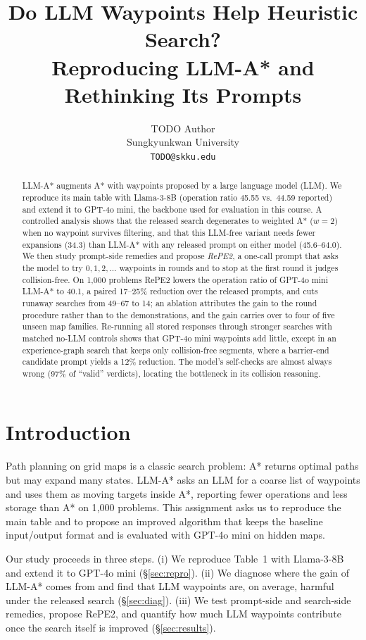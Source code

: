 \documentclass[11pt]{article}
\title{Do LLM Waypoints Help Heuristic Search?\\Reproducing LLM-A* and Rethinking Its Prompts}
\author{TODO Author \\
  Sungkyunkwan University \\
  \texttt{TODO@skku.edu}}
\begin{document}
\maketitle

\begin{abstract}
LLM-A* augments A* with waypoints proposed by a large language model (LLM).
We reproduce its main table with Llama-3-8B (operation ratio 45.55 vs.\ 44.59 reported) and extend it to GPT-4o mini, the backbone used for evaluation in this course.
A controlled analysis shows that the released search degenerates to weighted A* ($w{=}2$) when no waypoint survives filtering, and that this LLM-free variant needs fewer expansions (34.3) than LLM-A* with any released prompt on either model (45.6--64.0).
We then study prompt-side remedies and propose \emph{RePE2}, a one-call prompt that asks the model to try $0,1,2,\dots$ waypoints in rounds and to stop at the first round it judges collision-free.
On 1{,}000 problems RePE2 lowers the operation ratio of GPT-4o mini LLM-A* to 40.1, a paired 17--25\% reduction over the released prompts, and cuts runaway searches from 49--67 to 14; an ablation attributes the gain to the round procedure rather than to the demonstrations, and the gain carries over to four of five unseen map families.
Re-running all stored responses through stronger searches with matched no-LLM controls shows that GPT-4o mini waypoints add little, except in an experience-graph search that keeps only collision-free segments, where a barrier-end candidate prompt yields a 12\% reduction.
The model's self-checks are almost always wrong (97\% of ``valid'' verdicts), locating the bottleneck in its collision reasoning.
\end{abstract}

\section{Introduction}
Path planning on grid maps is a classic search problem: A* \citep{hart1968astar} returns optimal paths but may expand many states.
LLM-A* \citep{meng2024llmastar} asks an LLM for a coarse list of waypoints and uses them as moving targets inside A*, reporting fewer operations and less storage than A* on 1{,}000 problems.
This assignment asks us to reproduce the main table and to propose an improved algorithm that keeps the baseline input/output format and is evaluated with GPT-4o mini on hidden maps.

Our study proceeds in three steps.
(i) We reproduce Table~1 with Llama-3-8B and extend it to GPT-4o mini (\S\ref{sec:repro}).
(ii) We diagnose where the gain of LLM-A* comes from and find that LLM waypoints are, on average, harmful under the released search (\S\ref{sec:diag}).
(iii) We test prompt-side and search-side remedies, propose RePE2, and quantify how much LLM waypoints contribute once the search itself is improved (\S\ref{sec:results}).
\end{document}
